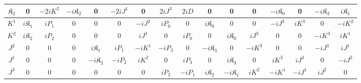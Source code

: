 \begin{minipage}[t]{\textwidth}
{\begin{tabular}{ |c||c|c|c|c|c|c|c|c|c|c|c|c|c|c|c| }
 \hline 
 \rule{0pt}{16pt} $\mathfrak{K}_{{2}}$ &0&$-2i{K}^{{2}}$&$-i\mathfrak{K}_{{2}}$&0&${-2i{J}^{{1}}}$&0&$2iJ^{{3}}$&$2iD$&0&0&0&$-i\mathfrak{K}_{{0}}$&0&${-i\mathfrak{K}_{{3}}}$&$i\mathfrak{K}_{{1}}$\\
 \hline 
 \rule{0pt}{16pt} ${K}^{{1}}$ &$i\mathfrak{K}_{{1}}$&$iP_{{1}}$&0&0&0&$-i{J}^{{2}}$&$iP_{{0}}$&0&$i\mathfrak{K}_{{0}}$&0&0&$-iJ^{{3}}$&${iK^{{3}}}$&0&$-i{K}^{{2}}$\\
 \hline 
 \rule{0pt}{16pt} ${K}^{{2}}$ &$i\mathfrak{K}_{{2}}$&$iP_{{2}}$&0&0&0&$i{J}^{{1}}$&0&$iP_{{0}}$&0&$i\mathfrak{K}_{{0}}$&$iJ^{{3}}$&0&0&${-iK^{{3}}}$&$i{K}^{{1}}$\\
 \hline 
 \rule{0pt}{16pt} ${J}^{{2}}$ &0&0&0&${i\mathfrak{K}_{{1}}}$&${iP_{{1}}}$&$-i{K}^{{1}}$&$-iP_{{3}}$&0&${-i\mathfrak{K}_{{3}}}$&0&$-iK^{{3}}$&0&0&$-iJ^{{3}}$&$i{J}^{{1}}$\\
 \hline 
 \rule{0pt}{16pt} ${J}^{{1}}$ &0&0&0&${-i\mathfrak{K}_{{2}}}$&${-iP_{{2}}}$&$i{K}^{{2}}$&0&$iP_{{3}}$&0&${i\mathfrak{K}_{{3}}}$&0&$iK^{{3}}$&$iJ^{{3}}$&0&$-i{J}^{{2}}$\\
 \hline 
 \rule{0pt}{16pt} $J^{{3}}$ &0&0&0&0&0&0&$iP_{{2}}$&$-iP_{{1}}$&$i\mathfrak{K}_{{2}}$&$-i\mathfrak{K}_{{1}}$&$i{K}^{{2}}$&$-i{K}^{{1}}$&$-i{J}^{{1}}$&$i{J}^{{2}}$&0\\
 \hline 
\end{tabular}}
\label{tabelIFD}
\end{minipage}
\endgroup

